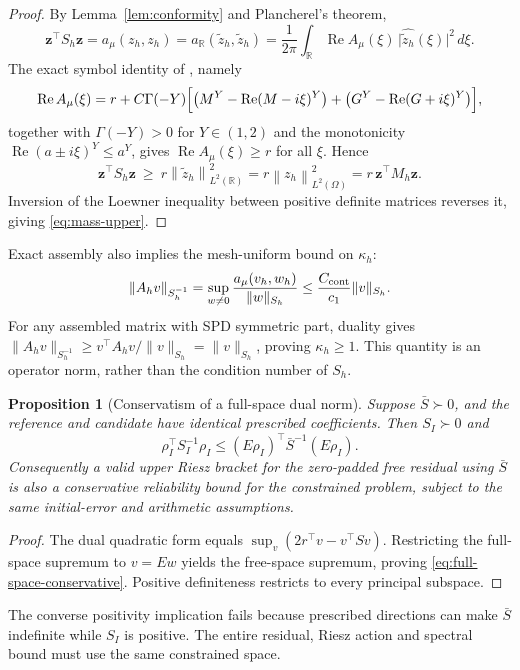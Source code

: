 \documentclass[11pt]{amsart}
\newtheorem{proposition}[theorem]{Proposition}
\theoremstyle{remark}
\newcommand{\R}{\mathbb{R}}
\newcommand{\Mh}{M_h}
\newcommand{\Ah}{A_h}
\newcommand{\Sh}{S_h}
\newcommand{\norm}[1]{\left\lVert #1\right\rVert}
\newcommand{\zz}{\mathbf z}
\newcommand{\rf}{r}
\DeclareMathOperator{\Real}{Re}
\begin{document}
\begin{proof}
By Lemma~\ref{lem:conformity} and Plancherel's theorem,
\[
  \zz^\top\Sh\zz=a_\mu(z_h,z_h)=a_\R(\widetilde z_h,\widetilde z_h)
  =\frac1{2\pi}\int_\R\Real A_\mu(\xi)\,\bigl|\widehat{\widetilde z_h}(\xi)\bigr|^2\,d\xi .
\]
The exact symbol identity of \cite{DamircheliCGMY2026}, namely
\begin{equation}
\Real A_\mu(\xi)
=\rf+C\Gamma(-Y)\Bigl[\bigl(M^Y-\Real(M-i\xi)^Y\bigr)
+\bigl(G^Y-\Real(G+i\xi)^Y\bigr)\Bigr],
\label{eq:symbol-real-exact}
\end{equation}
together with $\Gamma(-Y)>0$ for $Y\in(1,2)$ and the monotonicity
$\Real(a\pm i\xi)^Y\le a^Y$, gives $\Real A_\mu(\xi)\ge \rf$ for all $\xi$.  Hence
\[
  \zz^\top\Sh\zz\ \ge\ \rf\norm{\widetilde z_h}^2_{L^2(\R)}
  =\rf\norm{z_h}^2_{L^2(\Omega)}=\rf\,\zz^\top\Mh\zz .
\]
Inversion of the Loewner
inequality between positive definite matrices reverses it, giving
\eqref{eq:mass-upper}.
\end{proof}
Exact assembly also implies the mesh-uniform bound on $\kappa_h$:
\[
 \|\Ah v\|_{\Sh^{-1}}
 =\sup_{w\ne0}\frac{a_\mu(v_h,w_h)}{\|w\|_{\Sh}}
 \le\frac{C_{\rm cont}}{c_1}\|v\|_{\Sh}.
\]
For any assembled matrix with SPD symmetric part, duality gives
$\|\Ah v\|_{\Sh^{-1}}\ge v^\top\Ah v/\|v\|_{\Sh}=\|v\|_{\Sh}$,
proving $\kappa_h\ge1$. This quantity is an operator norm, rather than the
condition number of $\Sh$.
\begin{proposition}[Conservatism of a full-space dual norm]
\label{prop:full-space-conservative}
Suppose $\bar S\succ0$, and the reference and candidate have identical
prescribed coefficients. Then $S_I\succ0$ and
\begin{equation}
 \rho_I^\top S_I^{-1}\rho_I
 \le (E\rho_I)^\top\bar S^{-1}(E\rho_I).
 \label{eq:full-space-conservative}
\end{equation}
Consequently a valid upper Riesz bracket for the zero-padded free residual
using $\bar S$ is also a conservative reliability bound for the constrained
problem, subject to the same initial-error and arithmetic assumptions.
\end{proposition}
\begin{proof}
The dual quadratic form equals
$\sup_v(2r^\top v-v^\top S v)$. Restricting the full-space supremum to
$v=Ew$ yields the free-space supremum, proving
\eqref{eq:full-space-conservative}. Positive definiteness restricts to every
principal subspace.
\end{proof}
The converse positivity implication fails because prescribed directions
can make $\bar S$ indefinite while $S_I$ is positive. The entire residual,
Riesz action and spectral bound must use the same constrained space.
\end{document}
